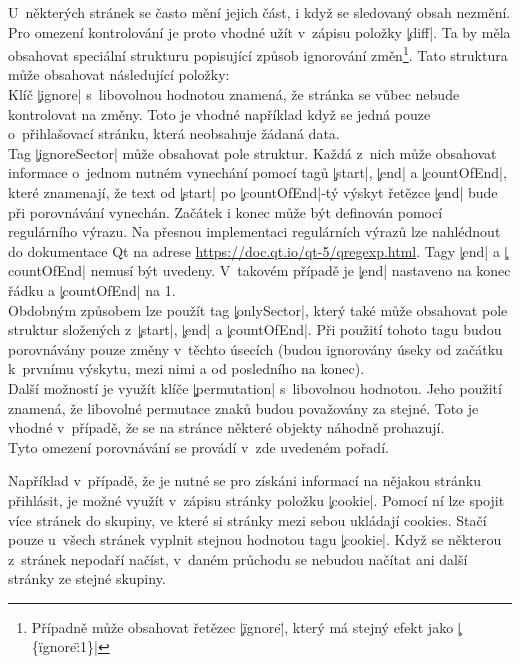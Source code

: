 U~některých stránek se často mění jejich část, i když se sledovaný obsah nezmění.
Pro omezení kontrolování je proto vhodné užít v~zápisu položky \c|diff|.
Ta by měla obsahovat speciální strukturu  popisující způsob ignorování změn\footnote{Případně může obsahovat řetězec \c|\"ignore\"|, který má stejný efekt jako \c|\{\"ignore\":1\}|}.
Tato struktura může obsahovat následující položky:\\
Klíč \c|ignore| s~libovolnou hodnotou znamená, že stránka se vůbec nebude kontrolovat na změny.
Toto je vhodné například když se jedná pouze o~přihlašovací stránku, která neobsahuje žádaná data.\\
Tag \c|ignoreSector| může obsahovat pole struktur.
Každá z~nich může obsahovat informace o~jednom nutném vynechání pomocí tagů \c|start|, \c|end| a \c|countOfEnd|,
které znamenají, že text od \c|start| po \c|countOfEnd|-tý výskyt řetězce \c|end| bude při porovnávání vynechán.
Začátek i konec může být definován pomocí regulárního výrazu.
Na přesnou implementaci regulárních výrazů lze nahlédnout do dokumentace Qt na adrese
\url{https://doc.qt.io/qt-5/qregexp.html}.
Tagy \c|end| a \c|countOfEnd| nemusí být uvedeny. V~takovém případě je \c|end| nastaveno na konec řádku a \c|countOfEnd| na 1.
\\
Obdobným způsobem lze použít tag \c|onlySector|, který také může obsahovat pole struktur složených z~\c|start|, \c|end| a \c|countOfEnd|.
Při použití tohoto tagu budou porovnávány pouze změny v~těchto úsecích (budou ignorovány úseky od začátku k~prvnímu výskytu, mezi nimi a od posledního na konec).
\\
Další možností je využít klíče \c|permutation| s~libovolnou hodnotou.
Jeho použití znamená, že libovolné permutace znaků budou považovány za stejné.
Toto je vhodné v~případě, že se na stránce některé objekty náhodně prohazují.
\\
Tyto omezení porovnávání se provádí v~zde uvedeném pořadí.




Například v~případě, že je nutné se pro získáni informací na nějakou stránku přihlásit, je možné využít v~zápisu stránky položku \c|cookie|.
Pomocí ní lze spojit více stránek do skupiny, ve které si stránky mezi sebou ukládají cookies.
Stačí pouze u~všech stránek vyplnit stejnou hodnotou tagu \c|cookie|.
Když se některou z~stránek nepodaří načíst, v~daném průchodu se nebudou načítat ani další stránky ze stejné skupiny.
